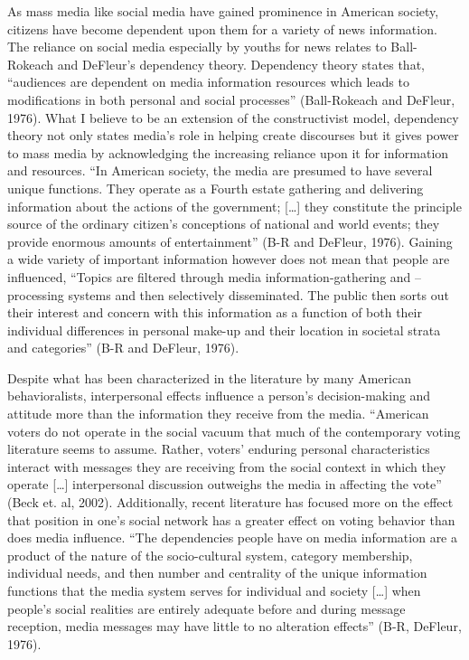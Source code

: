\documentclass[11pt,]{article}
\begin{document}
As mass media like social media have gained prominence in American
society, citizens have become dependent upon them for a variety of news
information. The reliance on social media especially by youths for news
relates to Ball-Rokeach and DeFleur's dependency theory. Dependency
theory states that, ``audiences are dependent on media information
resources which leads to modifications in both personal and social
processes'' (Ball-Rokeach and DeFleur, 1976). What I believe to be an
extension of the constructivist model, dependency theory not only states
media's role in helping create discourses but it gives power to mass
media by acknowledging the increasing reliance upon it for information
and resources. ``In American society, the media are presumed to have
several unique functions. They operate as a Fourth estate gathering and
delivering information about the actions of the government;
{[}\ldots{}{]} they constitute the principle source of the ordinary
citizen's conceptions of national and world events; they provide
enormous amounts of entertainment'' (B-R and DeFleur, 1976). Gaining a
wide variety of important information however does not mean that people
are influenced, ``Topics are filtered through media
information-gathering and --processing systems and then selectively
disseminated. The public then sorts out their interest and concern with
this information as a function of both their individual differences in
personal make-up and their location in societal strata and categories''
(B-R and DeFleur, 1976).

Despite what has been characterized in the literature by many American
behavioralists, interpersonal effects influence a person's
decision-making and attitude more than the information they receive from
the media. ``American voters do not operate in the social vacuum that
much of the contemporary voting literature seems to assume. Rather,
voters' enduring personal characteristics interact with messages they
are receiving from the social context in which they operate
{[}\ldots{}{]} interpersonal discussion outweighs the media in affecting
the vote'' (Beck et. al, 2002). Additionally, recent literature has
focused more on the effect that position in one's social network has a
greater effect on voting behavior than does media influence. ``The
dependencies people have on media information are a product of the
nature of the socio-cultural system, category membership, individual
needs, and then number and centrality of the unique information
functions that the media system serves for individual and society
{[}\ldots{}{]} when people's social realities are entirely adequate
before and during message reception, media messages may have little to
no alteration effects'' (B-R, DeFleur, 1976).
\end{document}
